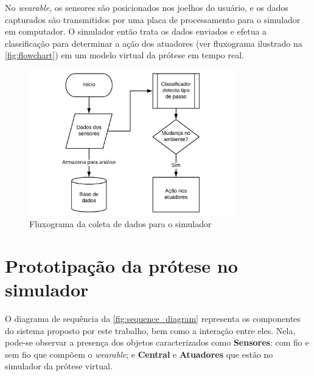
No \textit{wearable}, os sensores são posicionados nos joelhos do usuário, e os dados capturados são transmitidos por uma placa de processamento para o simulador em computador. 
O simulador então trata os dados enviados e efetua a classificação para determinar a ação dos atuadores (ver fluxograma ilustrado na \autoref{fig:flowchart}) em um modelo virtual da prótese em tempo real.

\begin{figure}[ht]
	\caption{\label{fig:flowchart}Fluxograma da coleta de dados para o simulador}
	\begin{center}
	    \includegraphics[width=0.8\textwidth]{resources/flowchart}
	\end{center}
\end{figure}


\section{Prototipação da prótese no simulador}\label{sec:metodo_prototipacao}

O diagrama de sequência da \autoref{fig:sequence_diagram} representa os componentes do sistema proposto por este trabalho, bem como a interação entre eles. Nela, pode-se observar a presença dos objetos caracterizados como \textbf{Sensores}: com fio e sem fio que compõem o \textit{wearable}; e \textbf{Central} e \textbf{Atuadores} que estão no simulador da prótese virtual. 

